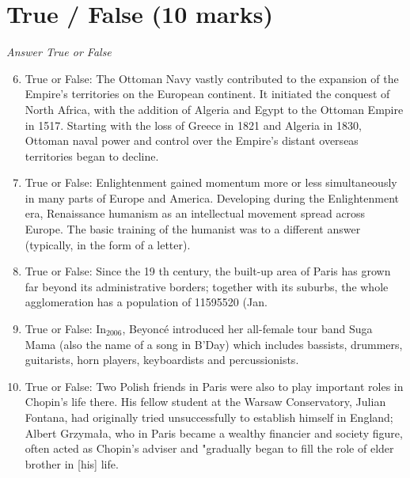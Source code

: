 \documentclass[12pt]{article}
\begin{document}
\section*{True / False (10 marks)}
\textit{Answer True or False}
\begin{enumerate}[label=\arabic*.]
\setcounter{enumi}{5}
\item True or False: The Ottoman Navy vastly contributed to the expansion of the Empire's territories on the European continent. It initiated the conquest of North Africa, with the addition of Algeria and Egypt to the Ottoman Empire in 1517. Starting with the loss of Greece in 1821 and Algeria in 1830, Ottoman naval power and control over the Empire's distant overseas territories began to decline.
\item True or False: Enlightenment gained momentum more or less simultaneously in many parts of Europe and America. Developing during the Enlightenment era, Renaissance humanism as an intellectual movement spread across Europe. The basic training of the humanist was to a different answer (typically, in the form of a letter).
\item True or False: Since the 19 th century, the built-up area of Paris has grown far beyond its administrative borders; together with its suburbs, the whole agglomeration has a population of 11595520 (Jan.
\item True or False: In$_{2006}$, Beyoncé introduced her all-female tour band Suga Mama (also the name of a song in B'Day) which includes bassists, drummers, guitarists, horn players, keyboardists and percussionists.
\item True or False: Two Polish friends in Paris were also to play important roles in Chopin's life there. His fellow student at the Warsaw Conservatory, Julian Fontana, had originally tried unsuccessfully to establish himself in England; Albert Grzymała, who in Paris became a wealthy financier and society figure, often acted as Chopin's adviser and "gradually began to fill the role of elder brother in [his] life.
\end{enumerate}
\end{document}
